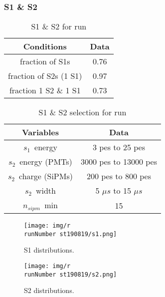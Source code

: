 \begin{frame}
\frametitle{S1 \& S2}

\begin{table}[h!]
\caption{S1 \& S2 for run \runNumber}
\begin{center}
\begin{tabular}{|c|c|}
\hline
Conditions & Data \\
\hline
fraction of S1s & 0.76 \\
fraction of S2s (1 S1) & 0.97 \\
fraction 1 S2 \& 1 S1 & 0.73 \\
\hline
\end{tabular}
\end{center}
\label{r\runNumber.data}
\end{table}%

\begin{table}[h!]
\caption{S1 \& S2 selection for run \runNumber}
\begin{center}
\begin{tabular}{|c|c|}
\hline
Variables & Data \\
\hline
$s_1$~energy & 3 pes to 25 pes \\
$s_2$~energy (PMTs) & 3000 pes to 13000 pes \\
$s_2$~charge (SiPMs) & 200 pes to 800 pes \\
$s_2$~width & 5 $\mu s$ to 15 $\mu s$ \\
$n_{sipm}$~min & 15\\
\hline
\end{tabular}
\end{center}
\label{r\runNumber.sel}
\end{table}%
\end{frame}


\begin{frame}
\begin{figure}
  \begin{center}
      \texttt{[image: img/r\\runNumber st190819/s1.png]}
    \caption{S1 distributions.}
  \end{center}
\end{figure}
\end{frame}

\begin{frame}
\begin{figure}
  \begin{center}
      \texttt{[image: img/r\\runNumber st190819/s2.png]}
    \caption{S2 distributions.}
  \end{center}
\end{figure}
\end{frame}

